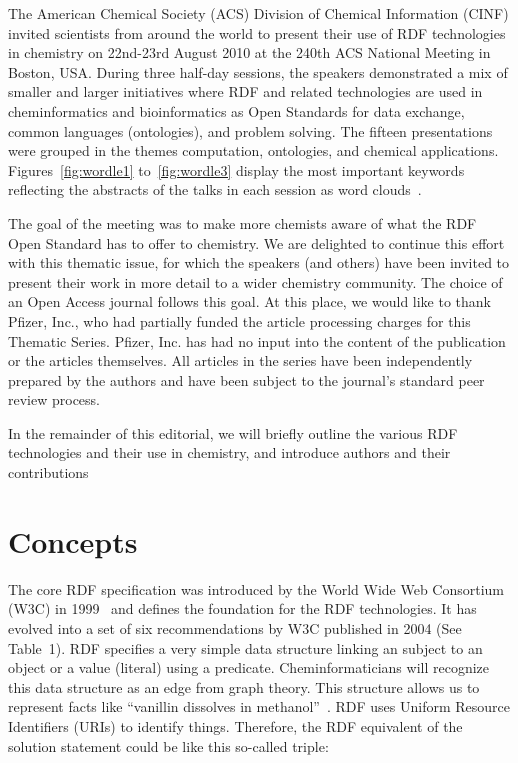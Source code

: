 \documentclass[10pt]{bmc_article}
\newenvironment{bmcformat}{\begin{raggedright}\baselineskip20pt\sloppy\setboolean{publ}{false}}{\end{raggedright}\baselineskip20pt\sloppy}
\begin{document}
\begin{bmcformat}
The American Chemical Society (ACS) Division of Chemical Information (CINF)
invited scientists from around the world to present their use of RDF
technologies in chemistry on 22nd-23rd August 2010
at the 240th ACS National Meeting in Boston, USA. During three half-day
sessions, the speakers demonstrated a mix of smaller and larger initiatives
where RDF and related technologies are used in cheminformatics and
bioinformatics as Open Standards for data exchange, common languages
(ontologies), and problem solving. The fifteen presentations were grouped in the themes computation,
ontologies, and chemical applications. Figures~\ref{fig:wordle1} to~\ref{fig:wordle3} display the most important
keywords reflecting the abstracts of the talks in each session as word
clouds~\cite{WORDLE}.

The goal of the meeting was to make more chemists aware of what the RDF Open
Standard has to offer to chemistry. We are delighted to continue this effort
with this thematic issue, for which the speakers (and others) have been invited
to present their work in more detail to a wider chemistry community. The choice
of an Open Access journal follows this goal. At this place, we would like to thank Pfizer, Inc., 
who had partially funded the article processing charges for this Thematic Series.
Pfizer, Inc. has had no input into the content of the publication or the articles themselves.
All articles in the series have been independently prepared by the authors and
have been subject to the journal's standard peer review process.

In the remainder of this editorial, we will briefly outline the various RDF
technologies and their use in chemistry, and introduce authors and their
contributions  

\section{Concepts}

The core RDF specification was introduced by the World Wide Web Consortium (W3C)
in 1999~\cite{Lassila1999} and defines the foundation for the RDF technologies. It has
evolved into a set of six recommendations by W3C published in 2004
(See Table~1). 
RDF specifies a very simple data structure linking an subject to an object or a
value (literal) using a predicate. Cheminformaticians will recognize this data
structure as an edge from graph theory. This structure allows us to represent
facts like ``vanillin dissolves in methanol''~\cite{ONS2010}. RDF uses Uniform
Resource Identifiers (URIs) to identify things. Therefore, the RDF equivalent of
the solution statement could be like this so-called triple:


\end{bmcformat}
\end{document}
